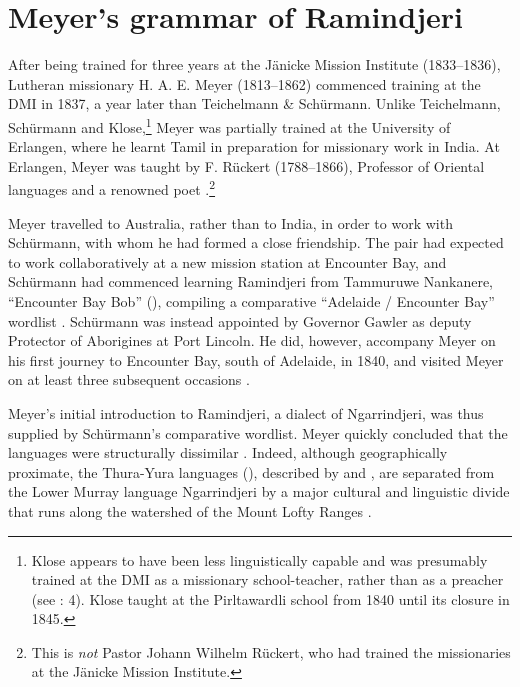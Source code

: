 \section{Meyer’s grammar of Ramindjeri \citeyearpar{meyer_vocabulary_1843}}
\label{sec:key:6.1}

\label{bkm:Ref73553344}\label{bkm:Ref74068587}\label{bkm:Ref73712330}
After being trained for three years at the Jänicke Mission Institute (1833--1836), Lutheran missionary H. A. E. Meyer (1813--1862) commenced training at the DMI in 1837, a year later than Teichelmann \& Schürmann. Unlike Teichelmann, Schürmann and Klose,\footnote{Klose appears to have been less linguistically capable and was presumably trained at the DMI as a missionary school-teacher, rather than as a preacher (see \citealt{Lockwood2014}: 4). Klose taught at the Pirltawardli school from 1840 until its closure in 1845.}  Meyer was partially trained at the University of Erlangen, where he learnt Tamil in preparation for missionary work in India. At Erlangen, Meyer was taught by F. Rückert (1788--1866), Professor of Oriental languages and a renowned poet \citep[74]{Lockwood2014}.\footnote{This is \textit{not} Pastor Johann Wilhelm Rückert, who had trained the missionaries at the Jänicke Mission Institute.}

Meyer travelled to Australia, rather than to India, in order to work with Schürmann, with whom he had formed a close friendship. The pair had expected to work collaboratively at a new mission station at Encounter Bay, and Schürmann had commenced learning Ramindjeri from Tammuruwe Nankanere, “Encounter Bay Bob” (), compiling a comparative “Adelaide / Encounter Bay” wordlist \citep[68]{Amery2016}. Schürmann was instead appointed by Governor Gawler as deputy Protector of Aborigines at Port Lincoln. He did, however, accompany Meyer on his first journey to Encounter Bay, south of Adelaide, in 1840, and visited Meyer on at least three subsequent occasions \citep[65]{Gale2011}.

Meyer’s initial introduction to Ramindjeri, a dialect of Ngarrindjeri, was thus supplied by Schürmann’s comparative wordlist. Meyer quickly concluded that the languages were structurally dissimilar \citep[65--66]{Gale2011}. Indeed, although geographically proximate, the Thura-Yura languages (\citealt{SimpsonHercus2004}), described by \citet{TeichelmannSchürmann1840} and \citet{schurmann_vocabulary_1844}, are separated from the Lower Murray language Ngarrindjeri \citep{Horgen2004} by a major cultural and linguistic divide that runs along the watershed of the Mount Lofty Ranges \citep[670]{Dixon2002}.

